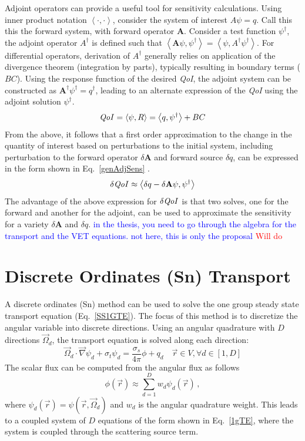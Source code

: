 \documentclass{article}
\newcommand{\vr}{\vec{r}}
\newcommand{\vO}{\vec{\Omega}}
\newcommand{\bra}{\left\langle}
\newcommand{\ket}{\right\rangle}
\newcommand{\grad}{\vec{\nabla}}
\newcommand{\sigt}{\sigma_t}
\newcommand{\sigs}{\sigma_s}
\newcommand{\qoi}{{\it QoI}\xspace}
\newcommand{\comment}[2]{\marginpar{\textcolor{#2}{$\star$}}\textcolor{#2}{#1}\newline}
\newcommand{\iwh}[1]{\comment{#1}{red}}
\newcommand{\jcr}[1]{\comment{#1}{blue}}
\newcommand{\iwh}[1]{\phantom{a}}
\newcommand{\jcr}[1]{\phantom{a}}
\begin{document}
Adjoint operators can provide a useful tool for sensitivity calculations. Using inner product notation $\bra \cdot , \cdot \ket$, consider the system of interest $A \psi = q$. Call this this the forward system, with forward operator $\mathbf{A}$. Consider a test function $\psi^\dag$, the adjoint operator $A^\dag$ is defined such that $\bra \mathbf{A} \psi, \psi^\dag \ket = \bra \psi, A^\dag \psi^\dag \ket $. For differential operators, derivation of $A^\dag$ generally relies on application of the divergence theorem (integration by parts), typically resulting in boundary terms ($BC$). Using the response function of the desired \qoi, the adjoint system can be constructed as $\mathbf{A^\dag} \psi^\dag = q^\dag$, leading to an alternate expression of the \qoi using the adjoint solution $\psi^\dag $.
\begin{equation}
\label{genAdjQoI}
\qoi = \bra \psi, R \ket = \bra q , \psi^\dag \ket + BC
\end{equation} 
From the above, it follows that a first order approximation to the change in the quantity of interest based on perturbations to the initial system, including perturbation to the forward operator $\delta \mathbf{A}$ and forward source $\delta q$, can be expressed in the form shown in Eq.~\eqref{genAdjSens} \cite{Marchuk}.
\begin{equation}
\label{genAdjSens}
\delta \qoi \approx \bra \delta q - \delta \mathbf{A} \psi , \psi^\dag \ket 
\end{equation}
The advantage of the above expression for $\delta \qoi$ is that two solves, one for the forward and another for the adjoint, can be used to approximate the sensitivity for a variety $\delta \mathbf{A}$ and $\delta q$.
\jcr{in the thesis, you need to go through the algebra for the transport and the VET equations. not here, this is only the proposal}
\iwh{Will do}
 
\section{Discrete Ordinates (Sn) Transport}
A discrete ordinates (Sn) method can be used to solve the one group steady state transport equation (Eq.~\eqref{SS1GTE}). The focus of this method is to discretize the angular variable into discrete directions. Using an angular quadrature with $D$ directions $\vO_d$, the transport equation is solved along each direction:
\begin{equation}
\label{1gTE}
\vO_d \cdot \grad \psi_d + \sigt \psi_d = \frac{\sigs}{4 \pi} \phi + q_d \quad \vr \in V , \forall d\in [1,D]
\end{equation}
%
The scalar flux can be computed from the angular flux as follows
\[
\phi(\vr) \approx \sum_{d=1}^D w_d \psi_d(\vr) \,,
\] 
where $\psi_d(\vr) = \psi(\vr, \vO_d)$ and $w_d$ is the angular quadrature weight. This leads to a coupled system of $D$ equations of the form shown in Eq.~\eqref{1gTE}, where the system is coupled through the scattering source term.
\end{document}
